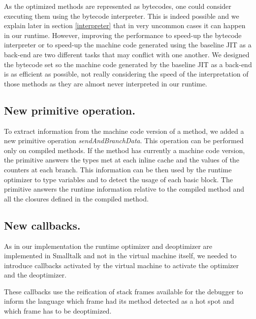 \documentclass[a4paper,12pt,twoside]{../includes/ThesisStyle}
\begin{document}
As the optimized methods are represented as bytecodes, one could consider executing them using the bytecode interpreter. This is indeed possible and we explain later in section \ref{interpreter} that in very uncommon cases it can happen in our runtime. However, improving the performance to speed-up the bytecode interpreter or to speed-up the machine code generated using the baseline JIT as a back-end are two different tasks that may conflict with one another. We designed the bytecode set so the machine code generated by the baseline JIT as a back-end is as efficient as possible, not really considering the speed of the interpretation of those methods as they are almost never interpreted in our runtime.

\subsection{New primitive operation.}

To extract information from the machine code version of a method, we added a new primitive operation \emph{sendAndBranchData}. This operation can be performed only on compiled methods. If the method has currently a machine code version, the primitive answers the types met at each inline cache and the values of the counters at each branch. This information can be then used by the runtime optimizer to type variables and to detect the usage of each basic block. The primitive answers the runtime information relative to the compiled method and all the closures defined in the compiled method.

\subsection{New callbacks.}

As in our implementation the runtime optimizer and deoptimizer are implemented in Smalltalk and not in the virtual machine itself, we needed to introduce callbacks activated by the virtual machine to activate the optimizer and the deoptimizer. 

These callbacks use the reification of stack frames available for the debugger to inform the language which frame had its method detected as a hot spot and which frame has to be deoptimized.


\end{document}
